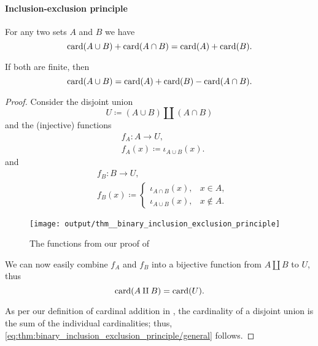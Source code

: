 \paragraph{Inclusion-exclusion principle}

\begin{theorem}\label{thm:binary_inclusion_exclusion_principle}
  For any two sets \( A \) and \( B \) we have
  \begin{equation}\label{eq:thm:binary_inclusion_exclusion_principle/general}
    \operatorname{card}(A \cup B) + \operatorname{card}(A \cap B) = \operatorname{card}(A) + \operatorname{card}(B).
  \end{equation}

  If both are finite, then
  \begin{equation}\label{eq:thm:binary_inclusion_exclusion_principle/finite}
    \operatorname{card}(A \cup B) = \operatorname{card}(A) + \operatorname{card}(B) - \operatorname{card}(A \cap B).
  \end{equation}
\end{theorem}
\begin{proof}
  Consider the disjoint union
  \begin{equation*}
    U \coloneqq (A \cup B) \amalg (A \cap B)
  \end{equation*}
  and the (injective) functions
  \begin{equation*}
    \begin{aligned}
      &f_A: A \to U, \\
      &f_A(x) \coloneqq \iota_{A \cup B}(x).
    \end{aligned}
  \end{equation*}
  and
  \begin{equation*}
    \begin{aligned}
      &f_B: B \to U, \\
      &f_B(x) \coloneqq \begin{cases}
        \iota_{A \cap B}(x), &x \in A, \\
        \iota_{A \cup B}(x), &x \not\in A.
      \end{cases}
    \end{aligned}
  \end{equation*}

  \begin{figure}[!ht]
    \centering
    \texttt{[image: output/thm\_\_binary\_inclusion\_exclusion\_principle]}
    \caption{The functions from our proof of }\label{fig:thm:binary_inclusion_exclusion_principle}
  \end{figure}

  We can now easily combine \( f_A \) and \( f_B \) into a bijective function from \( A \amalg B \) to \( U \), thus
  \begin{equation*}
    \operatorname{card}(A \amalg B) = \operatorname{card}(U).
  \end{equation*}

  As per our definition of cardinal addition in , the cardinality of a disjoint union is the sum of the individual cardinalities; thus, \eqref{eq:thm:binary_inclusion_exclusion_principle/general} follows.
\end{proof}

